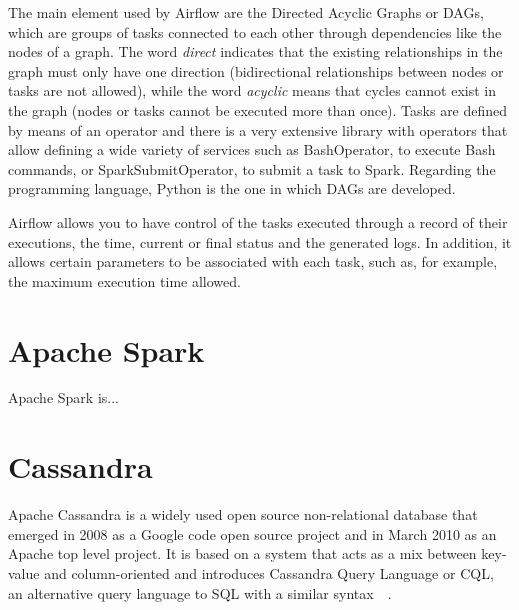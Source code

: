 \nonzeroparskip The main element used by Airflow are the Directed Acyclic Graphs or DAGs, which are groups of tasks connected to each other through dependencies like the nodes of a graph. The word \textit{direct} indicates that the existing relationships in the graph must only have one direction (bidirectional relationships between nodes or tasks are not allowed), while the word \textit{acyclic} means that cycles cannot exist in the graph (nodes or tasks cannot be executed more than once). Tasks are defined by means of an operator and there is a very extensive library with operators that allow defining a wide variety of services such as BashOperator, to execute Bash commands, or SparkSubmitOperator, to submit a task to Spark. Regarding the programming language, Python is the one in which DAGs are developed.

\nonzeroparskip Airflow allows you to have control of the tasks executed through a record of their executions, the time, current or final status and the generated logs. In addition, it allows certain parameters to be associated with each task, such as, for example, the maximum execution time allowed.

\section{Apache Spark}

\nonzeroparskip Apache Spark is...

\section{Cassandra}

\nonzeroparskip Apache Cassandra is a widely used open source non-relational database that emerged in 2008 as a Google code open source project and in March 2010 as an Apache top level project. It is based on a system that acts as a mix between key-value and column-oriented and introduces Cassandra Query Language or CQL, an alternative query language to SQL with a similar syntax~\cite{cassandra}~\cite{wikipedia_cassandra}.

